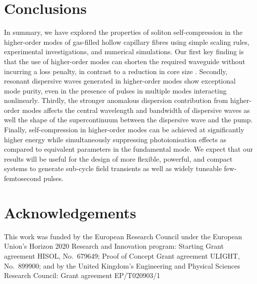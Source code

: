 \documentclass[amsmath, preprint, floatfix]{revtex4-2}
\begin{document}
\section{Conclusions}
In summary, we have explored the properties of soliton self-compression in the higher-order modes of gas-filled hollow capillary fibres using simple scaling rules, experimental investigations, and numerical simulations. Our first key finding is that the use of higher-order modes can shorten the required waveguide without incurring a loss penalty, in contrast to a reduction in core size \cite{brahms_high-energy_2019}. Secondly, resonant dispersive waves generated in higher-order modes show exceptional mode purity, even in the presence of pulses in multiple modes interacting nonlinearly. Thirdly, the stronger anomalous dispersion contribution from higher-order modes affects the central wavelength and bandwidth of dispersive waves as well the shape of the supercontinuum between the dispersive wave and the pump. Finally, self-compression in higher-order modes can be achieved at significantly higher energy while simultaneously suppressing photoionisation effects as compared to equivalent parameters in the fundamental mode. We expect that our results will be useful for the design of more flexible, powerful, and compact systems to generate sub-cycle field transients as well as widely tuneable few-femtosecond pulses.

\section*{Acknowledgements}
This work was funded by the European Research Council under the European Union’s Horizon 2020 Research and Innovation program: Starting Grant agreement HISOL, No.~679649; Proof of Concept Grant agreement ULIGHT, No.~899900; and by the United Kingdom's Engineering and Physical Sciences Research Council: Grant agreement EP/T020903/1


\end{document}
